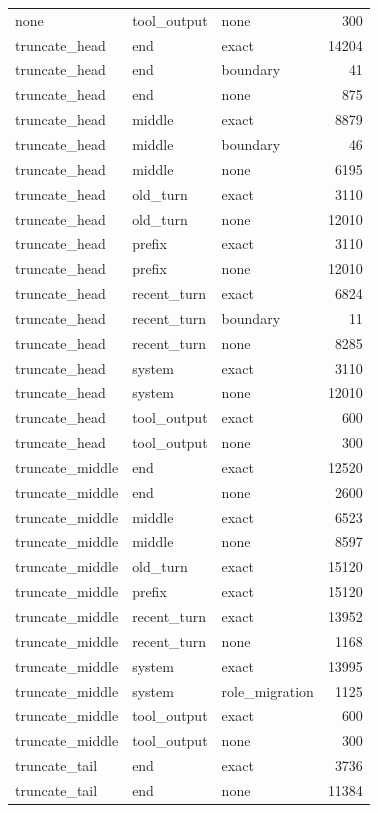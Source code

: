 \begin{tabular}{lllr}
none & tool_output & none & 300 \\
truncate_head & end & exact & 14204 \\
truncate_head & end & boundary & 41 \\
truncate_head & end & none & 875 \\
truncate_head & middle & exact & 8879 \\
truncate_head & middle & boundary & 46 \\
truncate_head & middle & none & 6195 \\
truncate_head & old_turn & exact & 3110 \\
truncate_head & old_turn & none & 12010 \\
truncate_head & prefix & exact & 3110 \\
truncate_head & prefix & none & 12010 \\
truncate_head & recent_turn & exact & 6824 \\
truncate_head & recent_turn & boundary & 11 \\
truncate_head & recent_turn & none & 8285 \\
truncate_head & system & exact & 3110 \\
truncate_head & system & none & 12010 \\
truncate_head & tool_output & exact & 600 \\
truncate_head & tool_output & none & 300 \\
truncate_middle & end & exact & 12520 \\
truncate_middle & end & none & 2600 \\
truncate_middle & middle & exact & 6523 \\
truncate_middle & middle & none & 8597 \\
truncate_middle & old_turn & exact & 15120 \\
truncate_middle & prefix & exact & 15120 \\
truncate_middle & recent_turn & exact & 13952 \\
truncate_middle & recent_turn & none & 1168 \\
truncate_middle & system & exact & 13995 \\
truncate_middle & system & role_migration & 1125 \\
truncate_middle & tool_output & exact & 600 \\
truncate_middle & tool_output & none & 300 \\
truncate_tail & end & exact & 3736 \\
truncate_tail & end & none & 11384 \\

\end{tabular}

